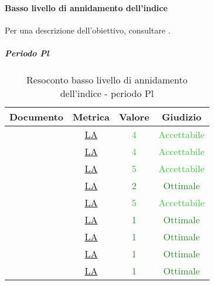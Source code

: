 				\newpage
					\paragraph{Basso livello di annidamento dell'indice}
						Per una descrizione dell'obiettivo, consultare .
						\subparagraph{Periodo Pl}
						\begin{table}[H]
							\centering
							\small
							\begin{tabular}{c | c | c | c}
								\hline
								\textbf{Documento} & \textbf{Metrica} & \textbf{Valore} & \textbf{Giudizio} \\
								\hline
								\pdpvdue        & \hyperref[MLEC]{LA} & \textcolor{LimeGreen}{4} & \textcolor{LimeGreen}{Accettabile} \\
								\pdqvdue        & \hyperref[MLEC]{LA} & \textcolor{LimeGreen}{4} & \textcolor{LimeGreen}{Accettabile} \\
								\ndpvdue        & \hyperref[MLEC]{LA} & \textcolor{LimeGreen}{5} & \textcolor{LimeGreen}{Accettabile} \\
								\adrvdue        & \hyperref[MLEC]{LA}& \textcolor{ForestGreen}{2} & \textcolor{ForestGreen}{Ottimale} \\
								\stvuno		& \hyperref[MLEC]{LA} & \textcolor{LimeGreen}{5} & \textcolor{LimeGreen}{Accettabile} \\
								\glvdue        & \hyperref[MLEC]{LA} & \textcolor{ForestGreen}{1} & \textcolor{ForestGreen}{Ottimale} \\
								\vcinquei       &\hyperref[MLEC]{LA} & \textcolor{ForestGreen}{1} & \textcolor{ForestGreen}{Ottimale} \\
								\vseii       & \hyperref[MLEC]{LA} & \textcolor{ForestGreen}{1} & \textcolor{ForestGreen}{Ottimale} \\
								\vtree       & \hyperref[MLEC]{LA} & \textcolor{ForestGreen}{1} & \textcolor{ForestGreen}{Ottimale} \\
								\hline
							\end{tabular}
							\caption{Resoconto basso livello di annidamento dell'indice - periodo Pl}
							\label{tab_resoconto_basso_livello_di_annidamento_indice_PPL}
						\end{table}
						
